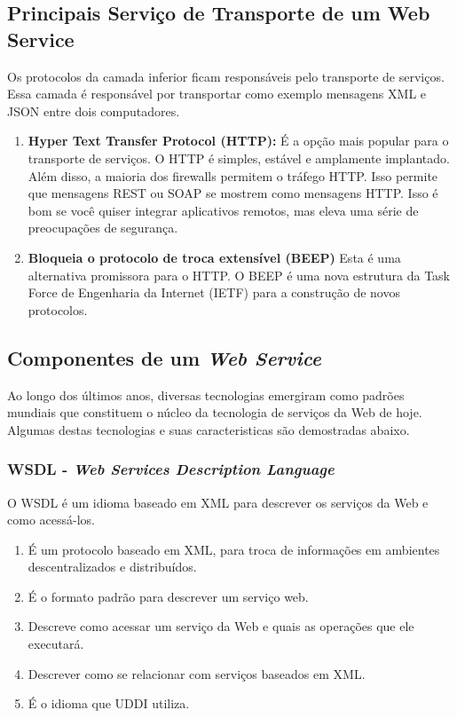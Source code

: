 \documentclass[12pt]{article}
\begin{document}
\subsection {Principais Serviço de Transporte de um Web Service}Os protocolos da camada inferior ficam responsáveis pelo transporte de serviços. Essa camada é responsável por transportar como exemplo mensagens XML e JSON entre dois computadores.
\begin{enumerate}
	\item \textbf{Hyper Text Transfer Protocol (HTTP):}
	É a opção mais popular para o transporte de serviços. O HTTP é simples, estável e amplamente implantado. Além disso, a maioria dos firewalls permitem o tráfego HTTP. Isso permite que mensagens REST ou SOAP se mostrem como mensagens HTTP. Isso é bom se você quiser integrar aplicativos remotos, mas eleva uma série de preocupações de segurança.
	\item \textbf{Bloqueia o protocolo de troca extensível (BEEP)}
	Esta é uma alternativa promissora para o HTTP. O BEEP é uma nova estrutura da Task Force de Engenharia da Internet (IETF) para a construção de novos protocolos.
\end{enumerate}


\subsection{Componentes de um \textit{Web Service}}
Ao longo dos últimos anos, diversas tecnologias emergiram como padrões mundiais que constituem o núcleo da tecnologia de serviços da Web de hoje. Algumas destas tecnologias e suas caracteristicas são demostradas abaixo.


\subsubsection{WSDL - \textit{Web Services Description Language} }
O WSDL é um idioma baseado em XML para descrever os serviços da Web e como acessá-los.

\begin{enumerate}
	\item É um protocolo baseado em XML, para troca de informações em ambientes descentralizados e distribuídos.
	\item É o formato padrão para descrever um serviço web.
	\item Descreve como acessar um serviço da Web e quais as operações que ele executará.
	\item Descrever como se relacionar com serviços baseados em XML.
	\item É o idioma que UDDI utiliza.
	
\end{enumerate}
\end{document}
